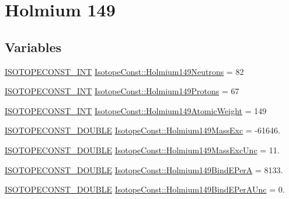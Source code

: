 \hypertarget{group___isotope_const-_holmium-_ho149}{}\section{Holmium 149}
\label{group___isotope_const-_holmium-_ho149}
\subsection*{Variables}
\begin{DoxyCompactItemize}
\item 
\mbox{\hyperlink{group___isotope_const-_macros_ga5f18360b3e99483a35c32d789e62621c}{I\+S\+O\+T\+O\+P\+E\+C\+O\+N\+S\+T\+\_\+\+I\+NT}} \mbox{\hyperlink{group___isotope_const-_holmium-_ho149_ga954eca04e851fe5ba51db52e8a9c6122}{Isotope\+Const\+::\+Holmium149\+Neutrons}} = 82
\item 
\mbox{\hyperlink{group___isotope_const-_macros_ga5f18360b3e99483a35c32d789e62621c}{I\+S\+O\+T\+O\+P\+E\+C\+O\+N\+S\+T\+\_\+\+I\+NT}} \mbox{\hyperlink{group___isotope_const-_holmium-_ho149_ga6fd4362248d87ebbd7fb361d858899bd}{Isotope\+Const\+::\+Holmium149\+Protons}} = 67
\item 
\mbox{\hyperlink{group___isotope_const-_macros_ga5f18360b3e99483a35c32d789e62621c}{I\+S\+O\+T\+O\+P\+E\+C\+O\+N\+S\+T\+\_\+\+I\+NT}} \mbox{\hyperlink{group___isotope_const-_holmium-_ho149_gaeeb0ce6e82e6f8a6c0550971b2ffb660}{Isotope\+Const\+::\+Holmium149\+Atomic\+Weight}} = 149
\item 
\mbox{\hyperlink{group___isotope_const-_macros_ga8f45a7272ce02c0b4c65c44636ed719a}{I\+S\+O\+T\+O\+P\+E\+C\+O\+N\+S\+T\+\_\+\+D\+O\+U\+B\+LE}} \mbox{\hyperlink{group___isotope_const-_holmium-_ho149_gad73f80d57ad89d60f80c3b7add5b95fb}{Isotope\+Const\+::\+Holmium149\+Mass\+Exc}} = -\/61646.
\item 
\mbox{\hyperlink{group___isotope_const-_macros_ga8f45a7272ce02c0b4c65c44636ed719a}{I\+S\+O\+T\+O\+P\+E\+C\+O\+N\+S\+T\+\_\+\+D\+O\+U\+B\+LE}} \mbox{\hyperlink{group___isotope_const-_holmium-_ho149_ga94509c4600f00208f82d69c6e60a6f8c}{Isotope\+Const\+::\+Holmium149\+Mass\+Exc\+Unc}} = 11.
\item 
\mbox{\hyperlink{group___isotope_const-_macros_ga8f45a7272ce02c0b4c65c44636ed719a}{I\+S\+O\+T\+O\+P\+E\+C\+O\+N\+S\+T\+\_\+\+D\+O\+U\+B\+LE}} \mbox{\hyperlink{group___isotope_const-_holmium-_ho149_ga6f7b90297bd87c1de65c0d69d255fa24}{Isotope\+Const\+::\+Holmium149\+Bind\+E\+PerA}} = 8133.
\item 
\mbox{\hyperlink{group___isotope_const-_macros_ga8f45a7272ce02c0b4c65c44636ed719a}{I\+S\+O\+T\+O\+P\+E\+C\+O\+N\+S\+T\+\_\+\+D\+O\+U\+B\+LE}} \mbox{\hyperlink{group___isotope_const-_holmium-_ho149_ga5d789c477dd9cf1029de4ab664203dce}{Isotope\+Const\+::\+Holmium149\+Bind\+E\+Per\+A\+Unc}} = 0.

\end{DoxyCompactItemize}
